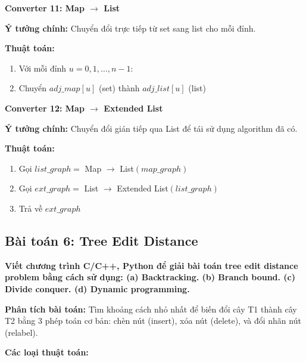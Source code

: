 \documentclass[12pt,a4paper]{article}
\begin{document}
\textbf{Converter 11: Map $\rightarrow$ List}

\textbf{Ý tưởng chính:} Chuyển đổi trực tiếp từ set sang list cho mỗi đỉnh.

\textbf{Thuật toán:}
\begin{enumerate}
    \item Với mỗi đỉnh $u = 0, 1, \ldots, n-1$:
    \item Chuyển $adj\_map[u]$ (set) thành $adj\_list[u]$ (list)
\end{enumerate}
\vspace{0.5cm}

\textbf{Converter 12: Map $\rightarrow$ Extended List}

\textbf{Ý tưởng chính:} Chuyển đổi gián tiếp qua List để tái sử dụng algorithm đã có.

\textbf{Thuật toán:}
\begin{enumerate}
    \item Gọi $list\_graph = $ Map $\rightarrow$ List$(map\_graph)$
    \item Gọi $ext\_graph = $ List $\rightarrow$ Extended List$(list\_graph)$
    \item Trả về $ext\_graph$
\end{enumerate}



\newpage

\subsection{Bài toán 6: Tree Edit Distance}

\begin{problembox}
    \textbf{Viết chương trình C/C++, Python để giải bài toán tree edit distance problem bằng cách sử dụng: (a) Backtracking. (b) Branch bound. (c) Divide conquer. (d) Dynamic programming.} 

\end{problembox}

\textbf{Phân tích bài toán:} Tìm khoảng cách nhỏ nhất để biến đổi cây T1 thành cây T2 bằng 3 phép toán cơ bản: chèn nút (insert), xóa nút (delete), và đổi nhãn nút (relabel).

\vspace{0.5cm}
\textbf{Các loại thuật toán: }
\end{document}
